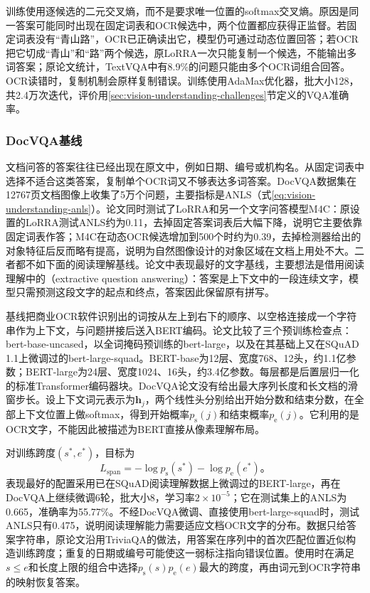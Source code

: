 训练使用逐候选的二元交叉熵，而不是要求唯一位置的softmax交叉熵。原因是同一答案可能同时出现在固定词表和OCR候选中，两个位置都应获得正监督。若固定词表没有“青山路”，OCR已正确读出它，模型仍可通过动态位置回答；若OCR把它切成“青山”和“路”两个候选，原LoRRA一次只能复制一个候选，不能输出多词答案；原论文统计，TextVQA中有8.9\%的问题只能由多个OCR词组合回答。OCR读错时，复制机制会原样复制错误。训练使用AdaMax优化器，批大小128，共2.4万次迭代，评价用\ref{sec:vision-understanding-challenges}节定义的VQA准确率。

\subsubsection{DocVQA基线}
\label{sec:vision-understanding-docvqa}

文档问答的答案往往已经出现在原文中，例如日期、编号或机构名。从固定词表中选择不适合这类答案，复制单个OCR词又不够表达多词答案。DocVQA数据集在12767页文档图像上收集了5万个问题，主要指标是ANLS（式\eqref{eq:vision-understanding-anls}）。论文同时测试了LoRRA和另一个文字问答模型M4C：原设置的LoRRA测试ANLS约为0.11，去掉固定答案词表后大幅下降，说明它主要依靠固定词表作答；M4C在动态OCR候选增加到500个时约为0.39，去掉检测器给出的对象特征后反而略有提高，说明为自然图像设计的对象区域在文档上用处不大。二者都不如下面的阅读理解基线。论文中表现最好的文字基线，主要想法是借用阅读理解中的（extractive question answering）：答案是上下文中的一段连续文字，模型只需预测这段文字的起点和终点，答案因此保留原有拼写。

基线把商业OCR软件识别出的词按从左上到右下的顺序、以空格连接成一个字符串作为上下文，与问题拼接后送入BERT编码。论文比较了三个预训练检查点：bert-base-uncased，以全词掩码预训练的bert-large，以及在其基础上又在SQuAD 1.1上微调过的bert-large-squad。BERT-base为12层、宽度768、12头，约1.1亿参数；BERT-large为24层、宽度1024、16头，约3.4亿参数。每层都是后置层归一化的标准Transformer编码器块。DocVQA论文没有给出最大序列长度和长文档的滑窗步长。设上下文词元表示为$\bm h_j$，两个线性头分别给出开始分数和结束分数，在全部上下文位置上做softmax，得到开始概率$p_{\mathrm s}(j)$和结束概率$p_{\mathrm e}(j)$。它利用的是OCR文字，不能因此被描述为BERT直接从像素理解布局。

对训练跨度$(s^*,e^*)$，目标为
\begin{equation}
  L_{\mathrm{span}}=-\log p_{\mathrm s}(s^*)-\log p_{\mathrm e}(e^*)\text{。}
  \label{eq:vision-docvqa-span}
\end{equation}
表现最好的配置采用已在SQuAD阅读理解数据上微调过的BERT-large，再在DocVQA上继续微调6轮，批大小8，学习率$2\times10^{-5}$；它在测试集上的ANLS为0.665，准确率为55.77\%。不经DocVQA微调、直接使用bert-large-squad时，测试ANLS只有0.475，说明阅读理解能力需要适应文档OCR文字的分布。数据只给答案字符串，原论文沿用TriviaQA的做法，用答案在序列中的首次匹配位置近似构造训练跨度；重复的日期或编号可能使这一弱标注指向错误位置。使用时在满足$s\leq e$和长度上限的组合中选择$p_{\mathrm s}(s)p_{\mathrm e}(e)$最大的跨度，再由词元到OCR字符串的映射恢复答案。

